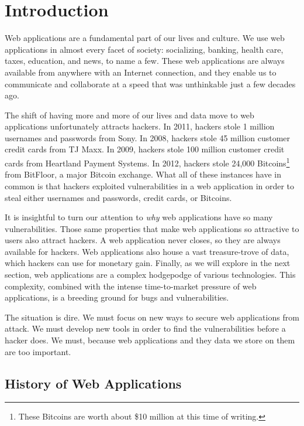 %
%

\chapter{Introduction}

Web applications are a fundamental part of our lives and culture. We
use web applications in almost every facet of society: socializing,
banking, health care, taxes, education, and news, to name a few. These
web applications are always available from anywhere with an Internet
connection, and they enable us to communicate and collaborate at a
speed that was unthinkable just a few decades ago.

The shift of having more and more of our lives and data move to web
applications unfortunately attracts hackers. In 2011, hackers stole 1
million usernames and passwords from Sony. In 2008, hackers stole 45
million customer credit cards from TJ Maxx. In 2009, hackers stole 100
million customer credit cards from Heartland Payment Systems. In 2012,
hackers stole 24,000 Bitcoins\footnote{These Bitcoins are worth about
  \$10 million at this time of writing.} from BitFloor, a major
Bitcoin exchange. What all of these instances have in common is that
hackers exploited vulnerabilities in a web application in order to
steal either usernames and passwords, credit cards, or Bitcoins.

It is insightful to turn our attention to \emph{why} web applications
have so many vulnerabilities. Those same properties that make web
applications so attractive to users also attract hackers. A web
application never closes, so they are always available for hackers.
Web applications also house a vast treasure-trove of data, which
hackers can use for monetary gain. Finally, as we will explore in the
next section, web applications are a complex hodgepodge of various
technologies. This complexity, combined with the intense
time-to-market pressure of web applications, is a breeding ground for
bugs and vulnerabilities.

The situation is dire. We must focus on new ways to secure web
applications from attack. We must develop new tools in order to find
the vulnerabilities before a hacker does. We must, because web
applications and they data we store on them are too important.

\section{History of Web Applications}

